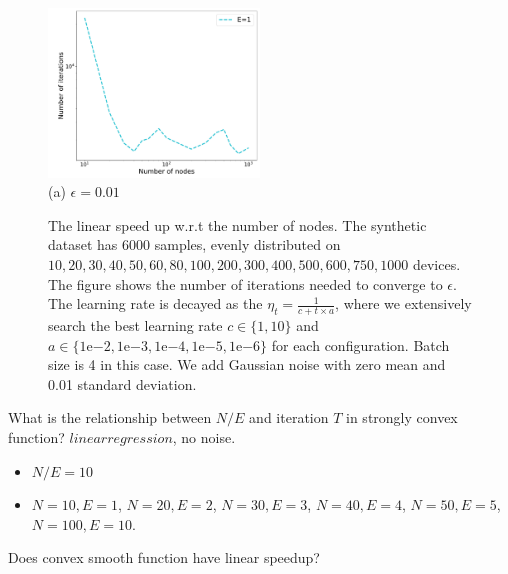 \begin{figure}
\centering
\includegraphics[width=0.5\textwidth]{fig/synthetic_linear_regression_noise1e-02-epsilon01008-logTrue-epoch-1-b4-adapt0.pdf} \\ 
(a) $\epsilon=0.01$ \\
	\caption{The linear speed up w.r.t the number of nodes. The synthetic dataset has $6000$ samples, evenly distributed on $10, 20, 30, 40, 50, 60, 80, 100, 200, 300, 400, 500, 600, 750, 1000$ devices. The figure shows the number of iterations needed to converge to $\epsilon$. The learning rate is decayed as the $\eta_t = \frac{1}{c + t \times a}$, where we extensively search the best learning rate $c \in \{1, 10\}$ and $a \in \{1\mathrm{e}{-2}, 1\mathrm{e}{-3}, 1\mathrm{e}{-4}, 1\mathrm{e}{-5}, 1\mathrm{e}{-6}\}$ for each configuration. Batch size is 4 in this case. 
	We add Gaussian noise with zero mean and 0.01 standard deviation.}
\end{figure}


What is the relationship between $N/E$ and iteration $T$ in strongly convex function? $linear regression$, no noise. 
\begin{itemize}
	\item $N/E = 10$
	\item $N=10, E=1$, $N=20, E=2$, $N=30, E=3$, $N=40, E=4$, $N=50, E=5$, $N=100, E=10$.
\end{itemize} 






Does convex smooth function have linear speedup?

